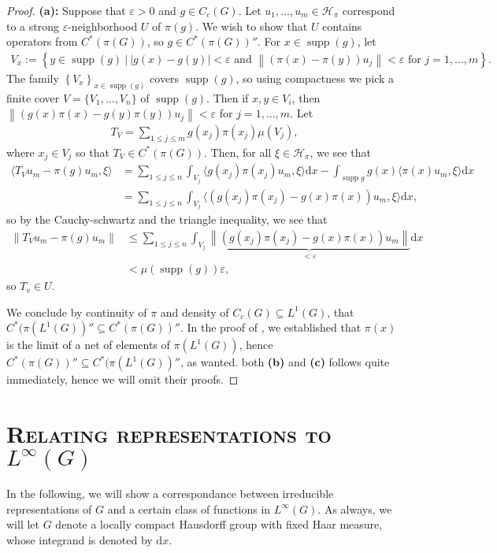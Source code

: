 \documentclass[10pt,twoside,openany,final]{memoir}
\newcommand{\sssection}[1]{%
\section[#1]{\centering\normalfont\scshape \textbf{#1}}}
\theoremstyle{definition}
\theoremstyle{Break}
\newcommand{\lv}{\left\lVert}
\newcommand{\rv}{\right\rVert}
\renewcommand{\H}{\mathcal{H}}
\DeclareMathOperator{\supp}{supp}
\renewcommand{\d}{\mathrm{d}}
\begin{document}
\begin{proof}
	\textbf{(a):} Suppose that $\varepsilon>0$ and $g \in C_c(G)$. Let $u_1,\dots,u_m \in \H_\pi$ correspond to a strong $\varepsilon$-neighborhood $U$ of $\pi(g)$. We wish to show that $U$ contains operators from $C^*(\pi(G))$, so $g \in C^*(\pi(G))''$. For $x \in \supp(g)$, let
	\begin{align*}
		V_x:=\left\{ y \in \supp(g) \ | \ |g(x)-g(y)|<\varepsilon \text { and } \lv (\pi(x)-\pi(y))u_j\rv < \varepsilon \text { for } j=1,\dots,m \right\}.
	\end{align*}
	The family $\left\{ V_x \right\}_{x \in \supp (g)}$ covers $\supp(g)$, so using compactness we pick a finite cover $V=\{V_1,\dots,V_n\}$ of $\supp(g)$. Then if $x,y \in V_i$, then $\lv (g(x) \pi(x)-g(y)\pi(y))u_j\rv < \varepsilon$ for $j=1,\dots,m$. Let 
	\begin{align*}
		T_V=\sum_{1 \leq j \leq m} g(x_j) \pi(x_j) \mu(V_j),
	\end{align*}
	where $x_j \in V_j$ so that $T_V \in C^*(\pi(G))$. Then, for all $\xi \in \H_\pi$, we see that
	\begin{align*}
		\langle T_V u_m-\pi(g) u_m,\xi \rangle &= \sum_{1 \leq j \leq n} \int_{V_j} \langle g(x_j) \pi(x_j)u_m,\xi\rangle \d x- \int_{\supp g} g(x) \langle \pi(x) u_m,\xi\rangle \d x \\
		&=\sum_{1 \leq j \leq n} \int_{V_j} \langle \left( g(x_j)\pi(x_j)-g(x)\pi(x) \right)u_m, \xi\rangle \d x,
	\end{align*}
	so by the Cauchy-schwartz and the triangle inequality, we see that
	\begin{align*}
		\lv T_V	u_m - \pi(g)u_m\rv &\leq \sum_{1 \leq j \leq n} \int_{V_j}\underbrace{\lv (g(x_j)\pi(x_j)-g(x)\pi(x))u_m \rv}_{< \varepsilon} \d x \\
		&<\mu(\supp(g))\varepsilon,
	\end{align*}
	so $T_v \in U$. 
	
	We conclude by continuity of $\pi$ and density of $C_c(G) \subseteq L^1(G)$, that $C^*(\pi(L^1(G))'' \subseteq C^*(\pi(G))''$. In the proof of , we established that $\pi(x)$ is the limit of a net of elements of $\pi(L^1(G))$, hence $C^*(\pi(G))'' \subseteq C^*(\pi(L^1(G))''$, as wanted. both \textbf{(b)} and \textbf{(c)} follows quite immediately, hence we will omit their proofs.
\end{proof}

\sssection{Relating representations to $L^\infty(G)$}
In the following, we will show a correspondance between irreducible representations of $G$ and a certain class of functions in $L^\infty(G)$. As always, we will let $G$ denote a locally compact Hausdorff group with fixed Haar measure, whose integrand is denoted by $\d x$. 
\end{document}
